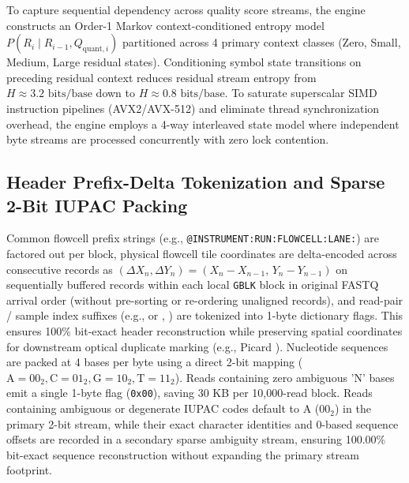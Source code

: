 \documentclass[10pt,twocolumn,a4paper]{article}
\begin{document}
To capture sequential dependency across quality score streams, the engine constructs an Order-1 Markov context-conditioned entropy model $P(R_i \mid R_{i-1}, Q_{\text{quant}, i})$ partitioned across 4 primary context classes (Zero, Small, Medium, Large residual states). Conditioning symbol state transitions on preceding residual context reduces residual stream entropy from $H \approx 3.2\text{ bits/base}$ down to $H \approx 0.8\text{ bits/base}$. To saturate superscalar SIMD instruction pipelines (AVX2/AVX-512) and eliminate thread synchronization overhead, the engine employs a 4-way interleaved state model where independent byte streams are processed concurrently with zero lock contention.

\subsection{Header Prefix-Delta Tokenization and Sparse 2-Bit IUPAC Packing}
Common flowcell prefix strings (e.g., \texttt{@INSTRUMENT:RUN:FLOWCELL:LANE:}) are factored out per block, physical flowcell tile coordinates are delta-encoded across consecutive records as $(\Delta X_n, \Delta Y_n) = (X_n - X_{n-1}, \, Y_n - Y_{n-1})$ on sequentially buffered records within each local \texttt{GBLK} block in original FASTQ arrival order (without pre-sorting or re-ordering unaligned records), and read-pair / sample index suffixes (e.g.,  or , ) are tokenized into 1-byte dictionary flags. This ensures 100\% bit-exact header reconstruction while preserving spatial coordinates for downstream optical duplicate marking (e.g., Picard ). Nucleotide sequences are packed at 4 bases per byte using a direct 2-bit mapping ($\text{A} = 00_2, \text{C} = 01_2, \text{G} = 10_2, \text{T} = 11_2$). Reads containing zero ambiguous 'N' bases emit a single 1-byte flag (\texttt{0x00}), saving 30 KB per 10,000-read block. Reads containing ambiguous or degenerate IUPAC codes default to $\text{A}$ ($00_2$) in the primary 2-bit stream, while their exact character identities and 0-based sequence offsets are recorded in a secondary sparse ambiguity stream, ensuring 100.00\% bit-exact sequence reconstruction without expanding the primary stream footprint.
\end{document}
